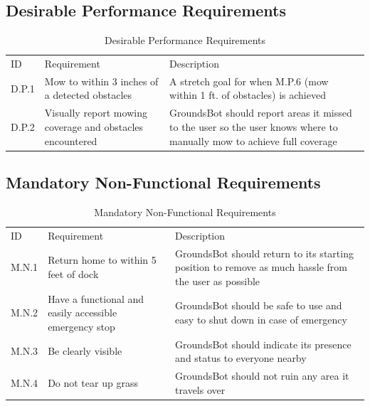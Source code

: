 \documentclass[12pt]{extarticle}
\begin{document}
\subsection{Desirable Performance Requirements}
\begin{center}
  \begin{table}[H]
  \caption{Desirable Performance Requirements}
  \label{table: desirable performance}
  

  \def\arraystretch{1.5}
  \begin{tabularx}{\textwidth}{ lXX }
      \hline
	  \sffamily\normalsize{ID} & \sffamily\normalsize{Requirement} & \sffamily\normalsize{Description} \\
	  D.P.1 &
	  Mow to within 3 inches of a detected obstacles &
	  A stretch goal for when M.P.6 (mow within 1 ft. of obstacles) is achieved \\
  	  D.P.2 &
  	  Visually report mowing coverage and obstacles encountered &
  	  GroundsBot should report areas it missed to the user so the user knows where to manually mow to achieve full coverage\\
  \end{tabularx}
  \end{table}
\end{center}

\subsection{Mandatory Non-Functional Requirements}
\begin{center}
  \begin{table}[H]
   \caption{Mandatory Non-Functional Requirements}
    \label{table: mandatory non-functional}
    

    \def\arraystretch{1.5}
    \begin{tabularx}{\textwidth}{ lXX }
     \hline
  	 \sffamily\normalsize{ID} & \sffamily\normalsize{Requirement} & \sffamily\normalsize{Description} \\
	  M.N.1 &
  	  Return home to within 5 feet of dock &
  	  GroundsBot should return to its starting position to remove as much hassle from the user as possible \\  	  
  	  M.N.2 &
  	  Have a functional and easily accessible emergency stop &
  	  GroundsBot should be safe to use and easy to shut down in case of emergency\\
  	  M.N.3 &
  	  Be clearly visible &
  	  GroundsBot should indicate its presence and status to everyone nearby \\
  	  M.N.4 &
  	  Do not tear up grass &
  	  GroundsBot should not ruin any area it travels over \\
  	\end{tabularx}
  \end{table}
\end{center}
\end{document}
